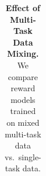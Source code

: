 \begin{table}[t]
\begin{minipage}[t]{0.85\linewidth}
{\begin{tabular}{@{} l | *3{c} | *3{c} | *3{c} | *3{c} @{}}
\bottomrule
\end{tabular}%
}
\end{minipage}\hfill
\begin{minipage}[t]{0.15\linewidth}
\vspace{0pt} %
\captionsetup{type=table}
\caption{\small \textbf{Effect of Multi-Task Data Mixing.} We compare reward models trained on mixed multi-task data vs.\ single-task data.}
\label{tab:data_mix_ablation}
\end{minipage}
\vspace{-16pt}
\end{table}
